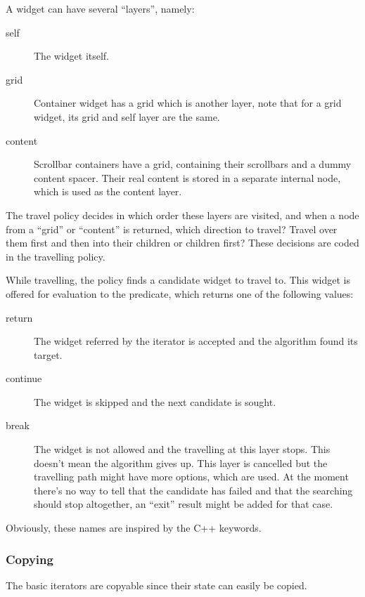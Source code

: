 A widget can have several ``layers'', namely:

\begin{description}
\item[self] The widget itself.
\item[grid] Container widget has a grid which is another layer, note that for a
	grid widget, its grid and self layer are the same.
\item[content] Scrollbar containers have a grid, containing their scrollbars and
	a dummy content spacer. Their real content is stored in a separate internal
	node, which is used as the content layer.
\end{description}

The travel policy decides in which order these layers are visited, and when a
node from a ``grid'' or ``content'' is returned, which direction to travel?
Travel over them first and then into their children or children first? These
decisions are coded in the travelling policy.

While travelling, the policy finds a candidate widget to travel to. This widget is
offered for evaluation to the predicate, which returns one of the following
values:

\begin{description}
\item[return] The widget referred by the iterator is accepted and the algorithm
	found its target.
\item[continue] The widget is skipped and the next candidate is sought.
\item[break] The widget is not allowed and the travelling at this layer stops.
	This doesn't mean the algorithm gives up. This layer is cancelled but the
	travelling path might have more options, which are used. At the moment there's
	no way to tell that the candidate has failed and that the searching should stop
	altogether, an ``exit'' result might be added for that case.
\end{description}

Obviously, these names are inspired by the C++ keywords.

\subsubsection{Copying}

The basic iterators are copyable since their state can easily be copied.

\paragraph{}

